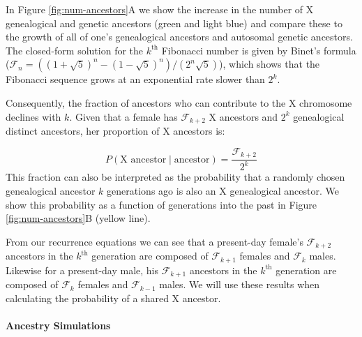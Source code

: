 \documentclass[11pt]{article}
\begin{document}


In Figure \ref{fig:num-ancestors}A we show the increase in the number of X
genealogical and genetic ancestors (green and light blue) and compare these to
the growth of all of one's genealogical ancestors and autosomal genetic
ancestors. The closed-form solution for the $k^\text{th}$ Fibonacci number is
given by Binet's formula ($\mathcal{F}_n = ((1 + \sqrt{5})^n - (1 -
\sqrt{5})^n)/(2^n \sqrt{5})$), which shows that the Fibonacci sequence grows at
an exponential rate slower than $2^k$. 

Consequently, the fraction of ancestors who can contribute to the X chromosome
declines with $k$. Given that a female has $\mathcal{F}_{k+2}$ X ancestors and
$2^k$ genealogical distinct ancestors, her proportion of X ancestors is:

\begin{equation}
  \label{eq:prob-x-anc}
  P(\text{X ancestor} \;|\; \text{ancestor}) = \frac{\mathcal{F}_{k+2}}{2^k} 
\end{equation}
%
This fraction can also be interpreted as the probability that a randomly chosen
genealogical ancestor $k$ generations ago is also an X genealogical ancestor.
We show this probability as a function of generations into the past in Figure
\ref{fig:num-ancestors}B (yellow line).

From our recurrence equations we can see that a present-day female's
$\mathcal{F}_{k+2}$ ancestors in the $k^\text{th}$ generation are composed of
$\mathcal{F}_{k+1}$ females and $\mathcal{F}_{k}$ males. Likewise for a
present-day male, his $\mathcal{F}_{k+1}$ ancestors in the $k^\text{th}$
generation are composed of $\mathcal{F}_{k}$ females and $\mathcal{F}_{k-1}$
males. We will use these results when calculating the probability of a shared X
ancestor.

\paragraph{Ancestry Simulations} 
\end{document}
